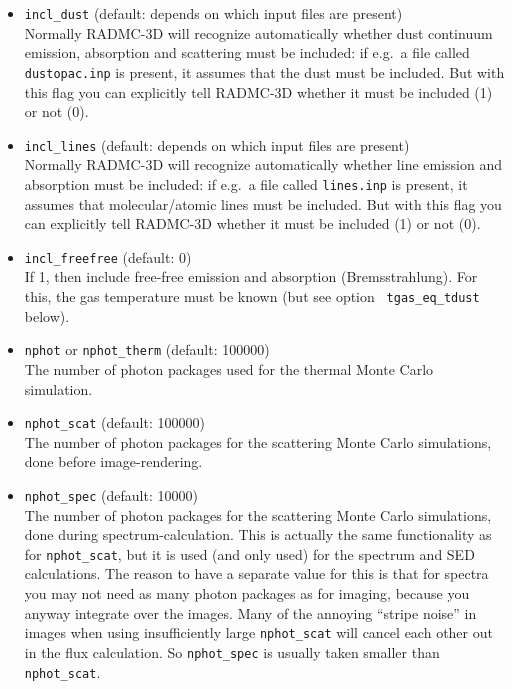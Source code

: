 \documentclass{report}
\begin{document}
\begin{itemize}
\item {\small\tt incl\_dust} (default: depends on which input files are present)\\
  Normally RADMC-3D will recognize automatically whether dust continuum 
  emission, absorption and scattering must be included: if e.g.\ a file
  called {\small\tt dustopac.inp} is present, it assumes that the dust 
  must be included. But with this flag you can explicitly tell RADMC-3D
  whether it must be included (1) or not (0).
\item {\small\tt incl\_lines} (default: depends on which input files are present)\\
  Normally RADMC-3D will recognize automatically whether line emission and
  absorption must be included: if e.g.\ a file called {\small\tt lines.inp}
  is present, it assumes that molecular/atomic lines must be included. But
  with this flag you can explicitly tell RADMC-3D whether it must be
  included (1) or not (0).
\item {\small\tt incl\_freefree} (default: 0)\\
  If 1, then include free-free emission and absorption (Bremsstrahlung).
  For this, the gas temperature must be known (but see option {\small\tt
    tgas\_eq\_tdust} below).
\item {\small\tt nphot} or {\small\tt nphot\_therm} (default: 100000)\\
  The number of photon packages used for the thermal Monte Carlo simulation.
\item {\small\tt nphot\_scat} (default: 100000)\\
  The number of photon packages for the scattering Monte Carlo simulations, 
  done before image-rendering.
\item {\small\tt nphot\_spec} (default: 10000)\\
  The number of photon packages for the scattering Monte Carlo simulations,
  done during spectrum-calculation. This is actually the same functionality
  as for {\small\tt nphot\_scat}, but it is used (and only used) for the
  spectrum and SED calculations. The reason to have a separate value for
  this is that for spectra you may not need as many photon packages as for
  imaging, because you anyway integrate over the images. Many of the
  annoying ``stripe noise'' in images when using insufficiently large
  {\small\tt nphot\_scat} will cancel each other out in the flux
  calculation. So {\small\tt nphot\_spec} is usually taken smaller than
  {\small\tt nphot\_scat}.

\end{itemize}
\end{document}
